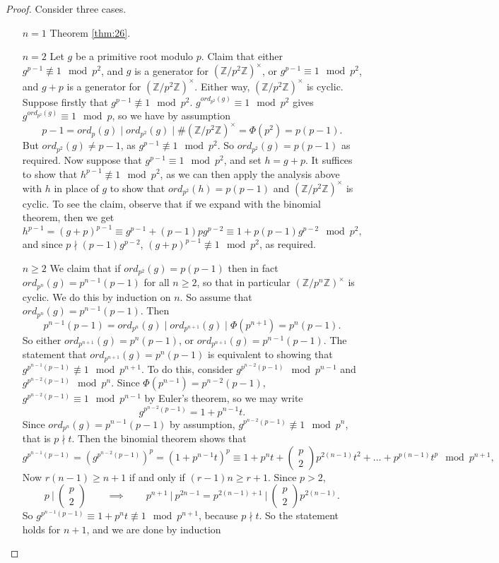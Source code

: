 \documentclass{article}
\newcommand{\Z}{\mathbb{Z}}
\newcommand{\rb}[1]{\left( #1 \right)}
\newcommand{\two}[2]{\begin{pmatrix} #1 \\ #2 \end{pmatrix}}
\newcommand{\unit}[1]{\rb{\Z / #1\Z}^\times}
\theoremstyle{definition}\newtheorem{definition}{Definition}
\theoremstyle{definition}\newtheorem{remark}[definition]{Remark}
\theoremstyle{definition}\newtheorem*{example}{Example}
\theoremstyle{definition}\newtheorem*{note}{Note}
\begin{document}
\begin{proof}
Consider three cases.
\begin{itemize}
\item[$ n = 1 $] Theorem \ref{thm:26}.
\item[$ n = 2 $] Let $ g $ be a primitive root modulo $ p $. Claim that either $ g^{p - 1} \not\equiv 1 \mod p^2 $, and $ g $ is a generator for $ \unit{p^2} $, or $ g^{p - 1} \equiv 1 \mod p^2 $, and $ g + p $ is a generator for $ \unit{p^2} $. Either way, $ \unit{p^2} $ is cyclic. Suppose firstly that $ g^{p - 1} \not\equiv 1 \mod p^2 $. $ g^{ord_{p^2}\rb{g}} \equiv 1 \mod p^2 $ gives $ g^{ord_{p^2}\rb{g}} \equiv 1 \mod p $, so we have by assumption
$$ p - 1 = ord_p\rb{g} \mid ord_{p^2}\rb{g} \mid \#\unit{p^2} = \Phi\rb{p^2} = p\rb{p - 1}. $$
But $ ord_{p^2}\rb{g} \ne p - 1 $, as $ g^{p - 1} \not\equiv 1 \mod p^2 $. So $ ord_{p^2}\rb{g} = p\rb{p - 1} $ as required. Now suppose that $ g^{p - 1} \equiv 1 \mod p^2 $, and set $ h = g + p $. It suffices to show that $ h^{p - 1} \not\equiv 1 \mod p^2 $, as we can then apply the analysis above with $ h $ in place of $ g $ to show that $ ord_{p^2}\rb{h} = p\rb{p - 1} $ and $ \unit{p^2} $ is cyclic. To see the claim, observe that if we expand with the binomial theorem, then we get
$$ h^{p - 1} = \rb{g + p}^{p - 1} \equiv g^{p - 1} + \rb{p - 1}pg^{p - 2} \equiv 1 + p\rb{p - 1}g^{p - 2} \mod p^2, $$
and since $ p \nmid \rb{p - 1}g^{p - 2} $, $ \rb{g + p}^{p - 1} \not\equiv 1 \mod p^2 $, as required.
\item[$ n \ge 2 $] We claim that if $ ord_{p^2}\rb{g} = p\rb{p - 1} $ then in fact $ ord_{p^n}\rb{g} = p^{n - 1}\rb{p - 1} $ for all $ n \ge 2 $, so that in particular $ \unit{p^n} $ is cyclic. We do this by induction on $ n $. So assume that $ ord_{p^n}\rb{g} = p^{n - 1}\rb{p - 1} $. Then
$$ p^{n - 1}\rb{p - 1} = ord_{p^n}\rb{g} \mid ord_{p^{n + 1}}\rb{g} \mid \Phi\rb{p^{n + 1}} = p^n\rb{p - 1}. $$
So either $ ord_{p^{n + 1}}\rb{g} = p^n\rb{p - 1} $, or $ ord_{p^{n + 1}}\rb{g} = p^{n - 1}\rb{p - 1} $. The statement that $ ord_{p^{n + 1}}\rb{g} = p^n\rb{p - 1} $ is equivalent to showing that $ g^{p^{n - 1}\rb{p - 1}} \not\equiv 1 \mod p^{n + 1} $. To do this, consider $ g^{p^{n - 2}\rb{p - 1}} \mod p^{n - 1} $ and $ g^{p^{n - 2}\rb{p - 1}} \mod p^n $. Since $ \Phi\rb{p^{n - 1}} = p^{n - 2}\rb{p - 1} $, $ g^{p^{n - 2}\rb{p - 1}} \equiv 1 \mod p^{n - 1} $ by Euler's theorem, so we may write
$$ g^{p^{n - 2}\rb{p - 1}} = 1 + p^{n - 1}t. $$
Since $ ord_{p^n}\rb{g} = p^{n - 1}\rb{p - 1} $ by assumption, $ g^{p^{n - 2}\rb{p - 1}} \not\equiv 1 \mod p^n $, that is $ p \nmid t $. Then the binomial theorem shows that
$$ g^{p^{n - 1}\rb{p - 1}} = \rb{g^{p^{n - 2}\rb{p - 1}}}^p = \rb{1 + p^{n - 1}t}^p \equiv 1 + p^nt + \two{p}{2}p^{2\rb{n - 1}}t^2 + \dots + p^{p\rb{n - 1}}t^p \mod p^{n + 1}, $$
Now $ r\rb{n - 1} \ge n + 1 $ if and only if $ \rb{r - 1}n \ge r + 1 $. Since $ p > 2 $,
$$ p \ \Big| \ \two{p}{2} \qquad \implies \qquad p^{n + 1} \ \Big| \ p^{2n - 1} = p^{2\rb{n - 1} + 1} \ \Big| \ \two{p}{2}p^{2\rb{n - 1}}. $$
So $ g^{p^{n - 1}\rb{p - 1}} \equiv 1 + p^nt \not\equiv 1 \mod p^{n + 1} $, because $ p \nmid t $. So the statement holds for $ n + 1 $, and we are done by induction
\end{itemize}
\end{proof}
\end{document}
